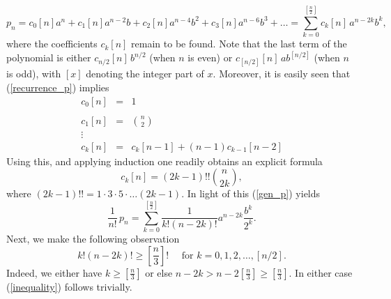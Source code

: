 \documentclass[11 pt]{article}
\begin{document}
 \begin{equation}\label{gen_p}
 p_n = c_0[n]a^n + c_1[n] a^{n-2}b + c_2[n] a^{n-4}b^2 +  c_3[n] a^{n-6}b^3 + \ldots  = \sum\limits_{k=0}^{[\frac{n}{2}]}c_k[n]\, a^{n-2k}b^k,
 \end{equation}
 where the coefficients $c_k[n]$ remain to be found. Note that the last term of the polynomial is either $c_{n/2}[n]\, b^{n/2}$ (when $n$ is even) or $c_{[n/2]}[n]\, a b^{[n/2]}$ (when $n$ is odd), with $[x]$ denoting the integer part of $x$.
Moreover, it is easily seen that (\ref{recurrence_p}) implies
\begin{equation}\label{recurrence_pp}
\begin{array}{lll}
c_0[n] &= &1  \\
&& \\
c_1[n]  &=& {n\choose{2}} \\
\vdots & &\\
c_k[n]& = & c_k[n-1] + (n-1) c_{k-1}[n-2]
\end{array}
\end{equation}
Using this, and applying induction one readily obtains an explicit formula
\begin{equation}\label{c_formula}
c_k[n] = (2k-1)!!  {n\choose{2k}},
\end{equation}
where $(2k-1)!! = 1\cdot3\cdot 5\cdot \ldots (2k-1)$.
In light of this (\ref{gen_p}) yields
\begin{equation}\label{term_T}
\frac{1}{n!} \, p_n = \sum\limits_{k=0}^{[\frac{n}{2}]}\frac{1}{k!(n-2k)!} a^{n-2k}\frac{b^k}{2^k} .
\end{equation}
  Next, we make the following observation
 \begin{equation}\label{inequality}
 k! (n-2k)! \geq \left[\frac{n}{3}\right]!\quad \mbox{ for } k = 0,1,2,\ldots , [n/2] .
 \end{equation}
 Indeed, we either have $k\geq \left[\frac{n}{3}\right]$ or else $n-2k > n -2 \left[\frac{n}{3}\right] \geq \left[\frac{n}{3}\right] $. In either case (\ref{inequality}) follows trivially.
\end{document}
